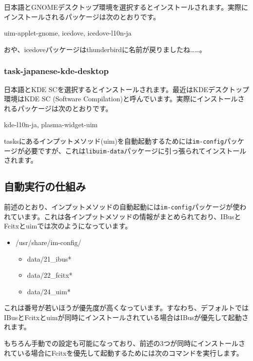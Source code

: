 \documentclass[mingoth,a4paper]{jsarticle}
\begin{document}
日本語とGNOMEデスクトップ環境を選択するとインストールされます。実際にインストールされるパッケージは次のとおりです。

\begin{commandline}
  uim-applet-gnome, icedove, icedove-l10n-ja
\end{commandline}

おや、icedoveパッケージはthunderbirdに名前が戻りましたね\ldots{}\ldots{}。

\subsubsection{task-japanese-kde-desktop}

日本語とKDE
SCを選択するとインストールされます。最近はKDEデスクトップ環境はKDE SC
(Software
Compilation)と呼んでいます。実際にインストールされるパッケージは次のとおりです。

\begin{commandline}
  kde-l10n-ja, plasma-widget-uim
\end{commandline}

tasksにあるインプットメソッド(uim)を自動起動するためには\texttt{im-config}パッケージが必要ですが、これは\texttt{libuim-data}パッケージに引っ張られてインストールされます。

\subsection{自動実行の仕組み}

前述のとおり、インプットメソッドの自動起動には\texttt{im-config}パッケージが使われています。これは各インプットメソッドの情報がまとめられており、IBusとFcitxとuimでは次のようになっています。

\begin{itemize}
\item /usr/share/im-config/
  \begin{itemize}
  \item
    data/21\_ibus*
  \item
    data/22\_fcitx*
  \item
    data/24\_uim*
  \end{itemize}
\end{itemize}

これは番号が若いほうが優先度が高くなっています。すなわち、デフォルトではIBusとFcitxとuimが同時にインストールされている場合はIBusが優先して起動されます。

もちろん手動での設定も可能になっており、前述の3つが同時にインストールされている場合にFcitxを優先して起動するためには次のコマンドを実行します。
\end{document}
